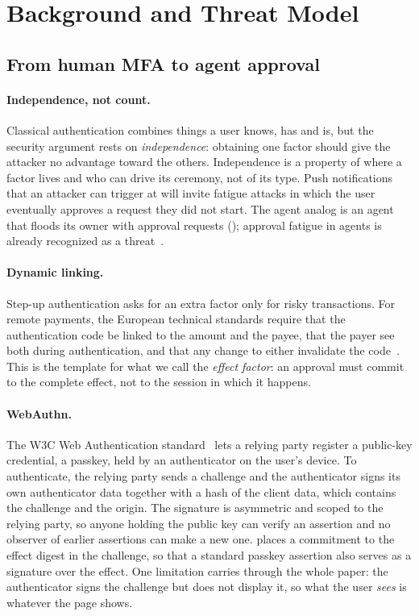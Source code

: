 \section{Background and Threat Model}\label{sec:background}

\subsection{From human MFA to agent approval}\label{sec:mfa}

\paragraph{Independence, not count.} Classical authentication combines things a user knows, has and is, but
the security argument rests on \emph{independence}: obtaining one factor should give the attacker no advantage
toward the others. Independence is a property of where a factor lives and who can drive its ceremony, not of
its type. Push notifications that an attacker can trigger at will invite fatigue attacks in which the user
eventually approves a request they did not start. The agent analog is an agent that floods its owner with
approval requests (); approval fatigue in agents is already recognized as a threat~\citep{wang2026reframing}.

\paragraph{Dynamic linking.} Step-up authentication asks for an extra factor only for risky transactions. For
remote payments, the European technical standards require that the authentication code be linked to the amount
and the payee, that the payer see both during authentication, and that any change to either invalidate the
code~\citep{psd2rts2018}. This is the template for what we call the \emph{effect factor}: an approval must commit
to the complete effect, not to the session in which it happens.

\paragraph{WebAuthn.} The W3C Web Authentication standard~\citep{webauthn2} lets a relying party register a
public-key credential, a passkey, held by an authenticator on the user's device. To authenticate, the relying
party sends a challenge and the authenticator signs its own authenticator data together with a hash of the
client data, which contains the challenge and the origin. The signature is asymmetric and scoped to the relying
party, so anyone holding the public key can verify an assertion and no observer of earlier assertions can make
a new one. \sys{} places a commitment to the effect digest in the challenge, so that a standard passkey assertion
also serves as a signature over the effect. One limitation carries through the whole paper: the authenticator
signs the challenge but does not display it, so what the user \emph{sees} is whatever the page shows.

